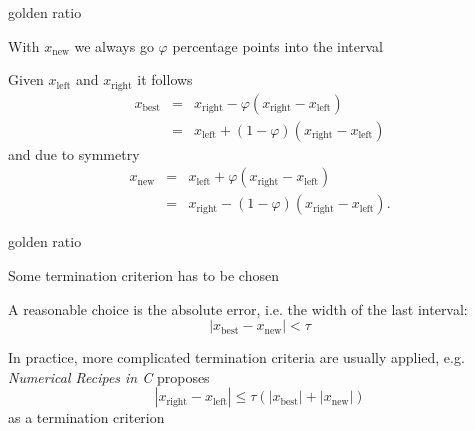 \documentclass[11pt,compress,t,notes=noshow, xcolor=table]{beamer}
\newcommand{\xleft}{x_{\text{left}}} %
\newcommand{\xright}{x_{\text{right}}} %
\newcommand{\xnew}{x_{\text{new}}} %
\newcommand{\xbest}{x_{\text{best}}} %
\begin{document}
\begin{framei}[fs=normalsize,sep=L]{golden ratio}
\item With $\xnew$ we always go $\varphi$ percentage points into the interval
\item Given $\xleft$ and $\xright$ it follows
\begin{eqnarray*}
\xbest&=&\xright-\varphi(\xright-\xleft)\\
&=&\xleft+(1-\varphi)(\xright-\xleft)
\end{eqnarray*}
and due to symmetry
\begin{eqnarray*}
\xnew&=& \xleft+\varphi(\xright-\xleft)\\ &=& \xright-(1-\varphi)(\xright-\xleft).
\end{eqnarray*}
\end{framei}

\begin{framei}[sep=L]{golden ratio}
\item Some termination criterion has to be chosen 
\item A reasonable choice is the absolute error, i.e. the width of the last interval:
$$|\xbest-\xnew| < \tau$$
\item In practice, more complicated termination criteria are usually applied, e.g. \emph{Numerical Recipes in C}  proposes
$$|\xright-\xleft| \le \tau (|\xbest| + |\xnew|)$$
as a termination criterion
\end{framei}

\endlecture
\end{document}
